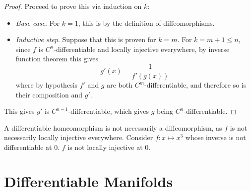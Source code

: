 \documentclass{article}
\begin{document}
\begin{proof}
    Proceed to prove this via induction on $k$:
    \begin{itemize}
        \item \emph{Base case}. For $k = 1$, this is by the definition of diffeomorphisms.
        \item \emph{Inductive step}. Suppose that this is proven for $k = m$. For $k = m+1 \leq n$, since $f$ is $C^n$-differentiable and locally injective everywhere, by inverse function theorem this gives
        \[
            g'(x) = \frac{1}{f'(g(x))}
        \]
        where by hypothesis $f'$ and $g$ are both $C^m$-differentiable, and therefore so is their composition and $g'$.
    \end{itemize}
    This gives $g'$ is $C^{n-1}$-differentiable, which gives $g$ being $C^n$-differentiable.
\end{proof}

\begin{remark}
    A differentiable homeomorphism is not necessarily a diffeomorphism, as $f$ is not necessarily locally injective everywhere. Consider $f: x \mapsto x^3$ whose inverse is not differentiable at $0$. $f$ is not locally injective at 0.  
\end{remark}

\section{Differentiable Manifolds}
\end{document}
